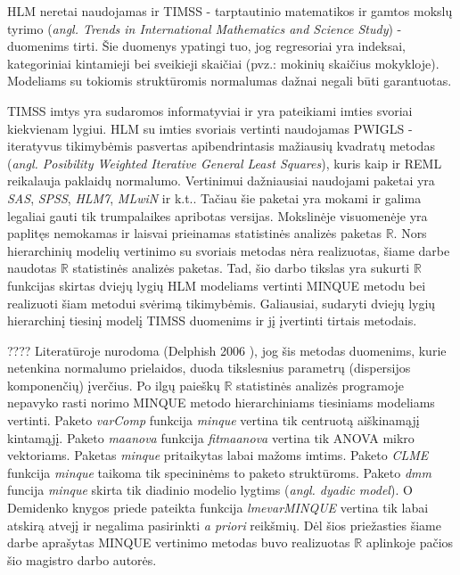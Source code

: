 \documentclass[12pt,a4paper]{article}
\newcommand{\R}{{\mathbb R}}
\begin{document}
\indent HLM neretai naudojamas ir TIMSS - tarptautinio matematikos ir gamtos mokslų tyrimo (\textit{angl. Trends in International Mathematics and Science Study}) - duomenims tirti. Šie duomenys ypatingi tuo, jog regresoriai yra indeksai, kategoriniai kintamieji bei sveikieji skaičiai (pvz.: mokinių skaičius mokykloje). Modeliams su tokiomis struktūromis normalumas dažnai negali būti garantuotas. 

\indent TIMSS imtys yra sudaromos informatyviai ir yra pateikiami imties svoriai kiekvienam lygiui. HLM su imties svoriais vertinti naudojamas PWIGLS - iteratyvus tikimybėmis pasvertas apibendrintasis mažiausių kvadratų metodas (\textit{angl. Posibility Weighted Iterative General Least Squares}), kuris kaip ir REML reikalauja paklaidų normalumo. Vertinimui dažniausiai naudojami paketai yra \textit{SAS}, \textit{SPSS}, \textit{HLM7}, \textit{MLwiN} ir k.t.. Tačiau šie paketai yra mokami ir galima legaliai gauti tik trumpalaikes apribotas versijas. Mokslinėje visuomenėje yra paplitęs nemokamas ir laisvai prieinamas statistinės analizės paketas $\R$. Nors hierarchinių modelių vertinimo su svoriais metodas nėra realizuotas, šiame darbe naudotas $\R$ statistinės analizės paketas. Tad, šio darbo tikslas yra sukurti $\R$ funkcijas skirtas dviejų lygių HLM modeliams vertinti MINQUE metodu bei realizuoti šiam metodui svėrimą tikimybėmis. Galiausiai, sudaryti dviejų lygių hierarchinį tiesinį modelį TIMSS duomenims ir jį įvertinti tirtais metodais.

???? Literatūroje nurodoma (Delphish 2006 \cite{delpish}), jog šis metodas duomenims, kurie netenkina normalumo prielaidos, duoda tikslesnius parametrų (dispersijos komponenčių) įverčius. Po ilgų paieškų $\R$ statistinės analizės programoje nepavyko rasti norimo MINQUE metodo hierarchiniams tiesiniams modeliams vertinti. Paketo \textit{varComp} funkcija \textit{minque} vertina tik centruotą aiškinamąjį kintamąjį. Paketo \textit{maanova} funkcija \textit{fitmaanova} vertina tik ANOVA mikro vektoriams. Paketas \textit{minque} pritaikytas labai mažoms imtims. Paketo \textit{CLME} funkcija \textit{minque} taikoma tik specininėms to paketo struktūroms. Paketo \textit{dmm} funcija \textit{minque} skirta  tik diadinio modelio lygtims (\textit{angl. dyadic model}). O Demidenko knygos \cite{mixedR} priede pateikta funkcija \textit{lmevarMINQUE} vertina tik labai atskirą atvejį ir negalima pasirinkti \textit{a priori} reikšmių. Dėl šios priežasties šiame darbe aprašytas MINQUE vertinimo metodas buvo realizuotas $\R$ aplinkoje pačios šio magistro darbo autorės.
\end{document}
